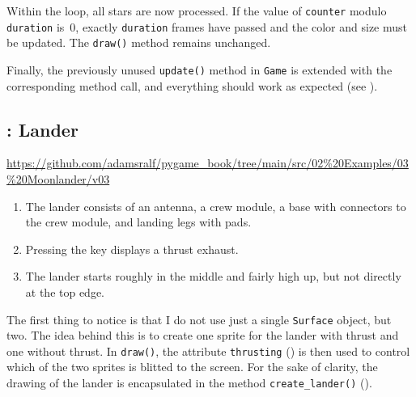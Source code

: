 Within the loop, all stars are now processed. If the value of \texttt{counter} modulo \texttt{duration} is~0, exactly \texttt{duration} frames have passed and the color and size must be updated. The \texttt{draw()} method remains unchanged.

\newpage
{}

Finally, the previously unused \texttt{update()} method in \texttt{Game} is extended with the corresponding method call, and everything should work as expected (see ).


\subsection{: Lander}
\begin{diskbox}
	\url{https://github.com/adamsralf/pygame_book/tree/main/src/02%20Examples/03%20Moonlander/v03}
\end{diskbox}
\begin{enumerate}
	\item The lander consists of an antenna, a crew module, a base with connectors to the crew module, and landing legs with pads.\label{reqLanderAufbau}
	\item Pressing the \keys{\SPACE} key displays a thrust exhaust. \label{reqLanderAusstoß}
	\item The lander starts roughly in the middle and fairly high up, but not directly at the top edge.\label{reqLanderStart}
\end{enumerate}
\er

The first thing to notice is that I do not use just a single \texttt{Surface} object, but two. The idea behind this is to create one sprite for the lander with thrust and one without thrust. In \texttt{draw()}, the attribute \texttt{thrusting} () is then used to control which of the two sprites is blitted to the screen. For the sake of clarity, the drawing of the lander is encapsulated in the method \texttt{create\_lander()} ().

